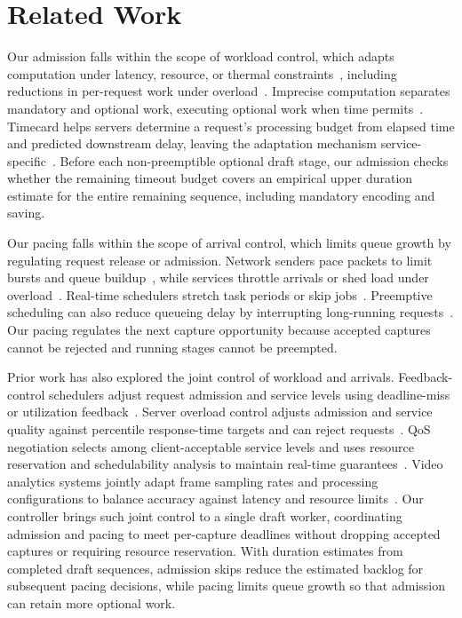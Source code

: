 \section{Related Work}
\label{sec:related_work}

Our admission falls within the scope of workload control, which adapts computation under latency, resource, or thermal constraints~\cite{approxdet-sensys,zilberstein-anytime,loop-perforation-fse,apnet-rtss,branchynet-icpr,mcdnn-mobisys,nestdnn-mobicom,agile3d-mobisys,phoenix-tecs}, including reductions in per-request work under overload~\cite{abdelzaher-content-adaptation,klein-brownout}.
Imprecise computation separates mandatory and optional work, executing optional work when time permits~\cite{shih-imprecise-siam,liu-imprecise-computation}.
Timecard helps servers determine a request's processing budget from elapsed time and predicted downstream delay, leaving the adaptation mechanism service-specific~\cite{timecard-sosp}.
Before each non-preemptible optional draft stage, our admission checks whether the remaining timeout budget covers an empirical upper duration estimate for the entire remaining sequence, including mandatory encoding and saving.

Our pacing falls within the scope of arrival control, which limits queue growth by regulating request release or admission.
Network senders pace packets to limit bursts and queue buildup~\cite{tcp-pacing-infocom,bbr-queue}, while services throttle arrivals or shed load under overload~\cite{seda-sosp,dagor-socc,breakwater-osdi,aurora-load-shedding}.
Real-time schedulers stretch task periods or skip jobs~\cite{buttazzo-elastic-task,koren-skip-over}.
Preemptive scheduling can also reduce queueing delay by interrupting long-running requests~\cite{shinjuku-nsdi}.
Our pacing regulates the next capture opportunity because accepted captures cannot be rejected and running stages cannot be preempted.

Prior work has also explored the joint control of workload and arrivals.
Feedback-control schedulers adjust request admission and service levels using deadline-miss or utilization feedback~\cite{lu-feedback-control-edf,lu-feedback-control-scheduling}.
Server overload control adjusts admission and service quality against percentile response-time targets and can reject requests~\cite{welsh-overload-control}.
QoS negotiation selects among client-acceptable service levels and uses resource reservation and schedulability analysis to maintain real-time guarantees~\cite{abdelzaher-qos-negotiation}.
Video analytics systems jointly adapt frame sampling rates and processing configurations to balance accuracy against latency and resource limits~\cite{chameleon-sigcomm,videostorm-nsdi,chanakya-neurips}.
Our controller brings such joint control to a single draft worker, coordinating admission and pacing to meet per-capture deadlines without dropping accepted captures or requiring resource reservation.
With duration estimates from completed draft sequences, admission skips reduce the estimated backlog for subsequent pacing decisions, while pacing limits queue growth so that admission can retain more optional work.